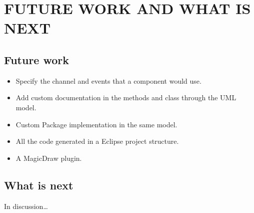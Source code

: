 \section{FUTURE WORK AND WHAT IS NEXT}

\subsection {Future work}
\begin{itemize}
  \item Specify the channel and events that a component would use.
  \item Add custom documentation in the methods and class through the UML model.
  \item Custom Package implementation in the same model.
  \item All the code generated in a Eclipse project structure.
  \item A MagicDraw plugin.
\end{itemize} 

\subsection {What is next}
In discussion\ldots